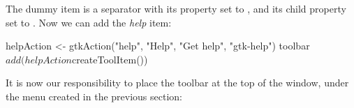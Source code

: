 % 
The dummy item is a separator with its  property set to
, and its  child property set to
. Now we can add the \textit{help} item:
\begin{Schunk}
\begin{Sinput}
 helpAction <- gtkAction("help", "Help", "Get help", "gtk-help")
 toolbar$add(helpAction$createToolItem())
\end{Sinput}
\end{Schunk}

It is now our responsibility to place the toolbar at the top of the
window, under the menu created in the previous section:
\begin{Schunk}
\end{Schunk}


